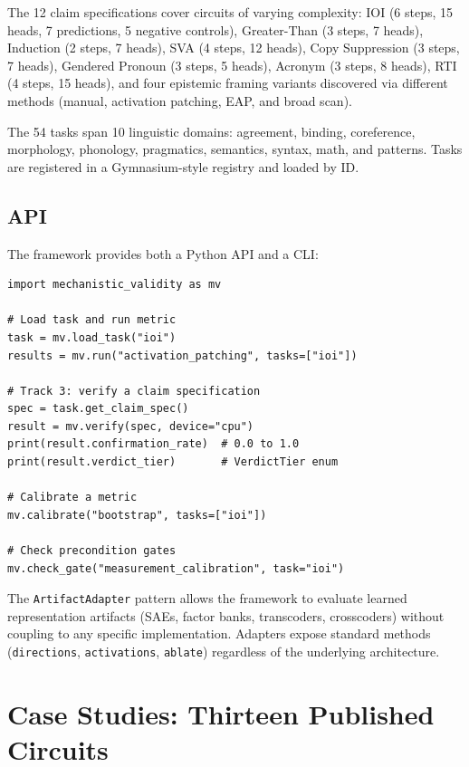 \documentclass[10pt]{article}
\begin{document}
The 12 claim specifications cover circuits of varying complexity: IOI \citep{wang2023interpretability} (6 steps, 15 heads, 7 predictions, 5 negative controls), Greater-Than \citep{hanna2023greater} (3 steps, 7 heads), Induction \citep{olsson2022context} (2 steps, 7 heads), SVA \citep{lazo2025sva} (4 steps, 12 heads), Copy Suppression \citep{mcdougall2023copy} (3 steps, 7 heads), Gendered Pronoun (3 steps, 5 heads), Acronym \citep{garcia2024acronym} (3 steps, 8 heads), RTI (4 steps, 15 heads), and four epistemic framing variants discovered via different methods (manual, activation patching, EAP, and broad scan).

The 54 tasks span 10 linguistic domains: agreement, binding, coreference, morphology, phonology, pragmatics, semantics, syntax, math, and patterns. Tasks are registered in a Gymnasium-style registry and loaded by ID.

\subsection{API}
\label{sec:api}

The framework provides both a Python API and a CLI:

\begin{verbatim}
import mechanistic_validity as mv

# Load task and run metric
task = mv.load_task("ioi")
results = mv.run("activation_patching", tasks=["ioi"])

# Track 3: verify a claim specification
spec = task.get_claim_spec()
result = mv.verify(spec, device="cpu")
print(result.confirmation_rate)  # 0.0 to 1.0
print(result.verdict_tier)       # VerdictTier enum

# Calibrate a metric
mv.calibrate("bootstrap", tasks=["ioi"])

# Check precondition gates
mv.check_gate("measurement_calibration", task="ioi")
\end{verbatim}

The \texttt{ArtifactAdapter} pattern allows the framework to evaluate learned representation artifacts (SAEs, factor banks, transcoders, crosscoders) without coupling to any specific implementation. Adapters expose standard methods (\texttt{directions}, \texttt{activations}, \texttt{ablate}) regardless of the underlying architecture.

\section{Case Studies: Thirteen Published Circuits}
\label{sec:case-studies}
\end{document}
